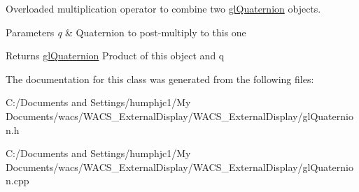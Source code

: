 Overloaded multiplication operator to combine two \hyperlink{classgl_quaternion}{glQuaternion} objects. 


\begin{DoxyParams}{Parameters}
{\em q} & Quaternion to post-\/multiply to this one \\
\hline
\end{DoxyParams}
\begin{DoxyReturn}{Returns}
\hyperlink{classgl_quaternion}{glQuaternion} Product of this object and q 
\end{DoxyReturn}


The documentation for this class was generated from the following files:\begin{DoxyCompactItemize}
\item 
C:/Documents and Settings/humphjc1/My Documents/wacs/WACS\_\-ExternalDisplay/WACS\_\-ExternalDisplay/glQuaternion.h\item 
C:/Documents and Settings/humphjc1/My Documents/wacs/WACS\_\-ExternalDisplay/WACS\_\-ExternalDisplay/glQuaternion.cpp\end{DoxyCompactItemize}
